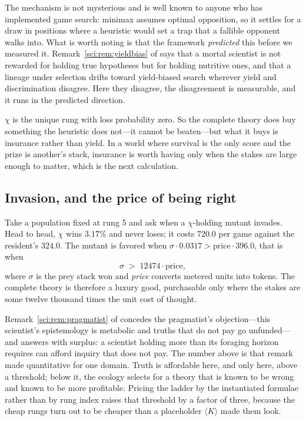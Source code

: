 The mechanism is not mysterious and is well known to anyone who has implemented
game search: minimax assumes optimal opposition, so it settles for a draw in
positions where a heuristic would set a trap that a fallible opponent walks
into. What is worth noting is that the framework \emph{predicted} this before we
measured it. Remark~\ref{sci:rem:yieldbias} of \chSci says that a mortal scientist is not
rewarded for holding true hypotheses but for holding nutritive ones, and that a
lineage under selection drifts toward yield-biased search wherever yield and
discrimination disagree. Here they disagree, the disagreement is measurable, and
it runs in the predicted direction.

\begin{corollary}\label{gam:truth-buys-safety-food}
$\chi$ is the unique rung with loss probability zero. So the complete theory
does buy something the heuristic does not---it cannot be beaten---but what it
buys is insurance rather than yield. In a world where survival is the only score
and the prize is another's stack, insurance is worth having only when the stakes
are large enough to matter, which is the next calculation.
\end{corollary}

\subsection{Invasion, and the price of being right}\label{gam:S8.2}

Take a population fixed at rung 5 and ask when a $\chi$-holding mutant invades.
Head to head, $\chi$ wins $3.17\%$ and never loses; it costs $720.0$ per game
against the resident's $324.0$. The mutant is favored when $\sigma \cdot
0.0317 > \text{price} \cdot 396.0$, that is when
\[
\sigma \;>\; 12474 \cdot \text{price},
\]
where $\sigma$ is the prey stack won and \emph{price} converts metered units
into tokens. The complete theory is therefore a luxury good, purchasable only
where the stakes are some twelve thousand times the unit cost of thought.

\begin{remark}\label{gam:basic-research-priced}
Remark~\ref{sci:rem:pragmatist} of \chSci concedes the pragmatist's objection---this
scientist's epistemology is metabolic and truths that do not pay go
unfunded---and answers with surplus: a scientist holding more than its foraging
horizon requires can afford inquiry that does not pay. The number above is that
remark made quantitative for one domain. Truth is affordable here, and only
here, above a threshold; below it, the ecology selects for a theory that is
known to be wrong and known to be more profitable. Pricing the ladder by the
instantiated formulae rather than by rung index raises that threshold by a
factor of three, because the cheap rungs turn out to be cheaper than a
placeholder $\langle K\rangle$ made them look.
\end{remark}

